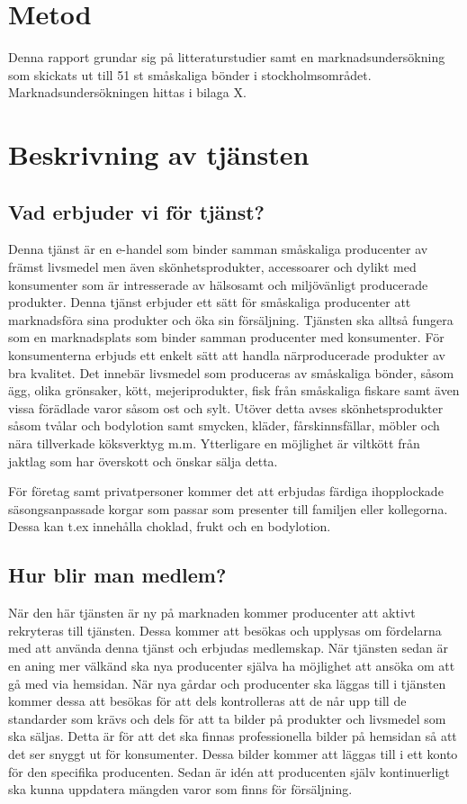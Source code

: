 \documentclass[10pt,a4paper,oneside]{article}
\begin{document}
\newpage

\section{Metod}
Denna rapport grundar sig på litteraturstudier samt en marknadsundersökning som skickats ut till 51 st småskaliga bönder i stockholmsområdet. Marknadsundersökningen hittas i bilaga X. 
\newpage

\section{Beskrivning av tjänsten}
\subsection{Vad erbjuder vi för tjänst?}
Denna tjänst är en e-handel som binder samman småskaliga producenter av främst livsmedel men även skönhetsprodukter, accessoarer och dylikt med konsumenter som är intresserade av hälsosamt och miljövänligt producerade produkter. Denna tjänst erbjuder ett sätt för småskaliga producenter att marknadsföra sina produkter och öka sin försäljning. Tjänsten ska alltså fungera som en marknadsplats som binder samman producenter med konsumenter. För konsumenterna erbjuds ett enkelt sätt att handla närproducerade produkter av bra kvalitet. Det innebär livsmedel som produceras av småskaliga bönder, såsom ägg, olika grönsaker, kött, mejeriprodukter, fisk från småskaliga fiskare samt även vissa förädlade varor såsom ost och sylt. Utöver detta avses skönhetsprodukter såsom tvålar och bodylotion samt smycken, kläder, fårskinnsfällar, möbler och nära tillverkade köksverktyg m.m. Ytterligare en möjlighet är viltkött från jaktlag som har överskott och önskar sälja detta. 

För företag samt privatpersoner kommer det att erbjudas färdiga ihopplockade säsongsanpassade korgar som passar som presenter till familjen eller kollegorna. Dessa kan t.ex innehålla choklad, frukt och en bodylotion.  

\subsection{Hur blir man medlem?}
När den här tjänsten är ny på marknaden kommer producenter att aktivt rekryteras till tjänsten. Dessa kommer att besökas och upplysas om fördelarna med att använda denna tjänst och erbjudas medlemskap. När tjänsten sedan är en aning mer välkänd ska nya producenter själva ha möjlighet att ansöka om att gå med via hemsidan. När nya gårdar och producenter ska läggas till i tjänsten kommer dessa att besökas för att dels kontrolleras att de når upp till de standarder som krävs och dels för att ta bilder på produkter och livsmedel som ska säljas. Detta är för att det ska finnas professionella bilder på hemsidan så att det ser snyggt ut för konsumenter. Dessa bilder kommer att läggas till i ett konto för den specifika producenten. Sedan är idén att producenten själv kontinuerligt ska kunna uppdatera mängden varor som finns för försäljning.  
\end{document}
